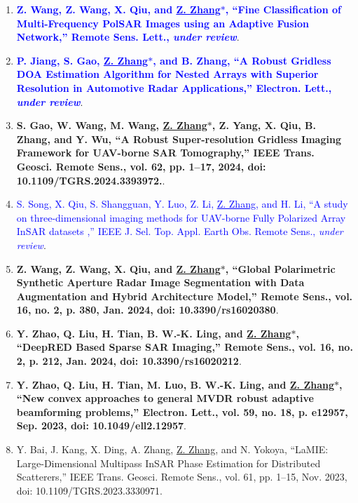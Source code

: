 \documentclass[paper=a4,fontsize=11pt]{scrartcl}
\begin{document}
\begin{enumerate}
\item \textcolor{blue}{\textbf{Z. Wang, Z. Wang, X. Qiu, and \underline{Z. Zhang$\ast$}, ``Fine Classification of Multi-Frequency PolSAR Images using an Adaptive Fusion Network,'' Remote Sens. Lett., \emph{under review}}}.

\item \textcolor{blue}{\textbf{P. Jiang, S. Gao, \underline{Z. Zhang$\ast$}, and B. Zhang, ``A Robust Gridless DOA Estimation Algorithm for Nested Arrays with Superior Resolution in Automotive Radar Applications,'' Electron. Lett., \emph{under review}}}.

\item \textbf{S. Gao, W. Wang, M. Wang, \underline{Z. Zhang$\ast$}, Z. Yang, X. Qiu, B. Zhang, and Y. Wu, ``A Robust Super-resolution Gridless Imaging Framework for UAV-borne SAR Tomography,'' IEEE Trans. Geosci. Remote Sens., vol. 62, pp. 1–17, 2024, doi: 10.1109/TGRS.2024.3393972.}.

\item \textcolor{blue}{S. Song, X. Qiu, S. Shangguan, Y. Luo, Z. Li, \underline{Z. Zhang}, and H. Li, ``A study on three-dimensional imaging methods for UAV-borne Fully Polarized Array InSAR datasets ,'' IEEE J. Sel. Top. Appl. Earth Obs. Remote Sens., \emph{under review}}.

\item \textbf{Z. Wang, Z. Wang, X. Qiu, and \underline{Z. Zhang$\ast$}, ``Global Polarimetric Synthetic Aperture Radar Image Segmentation with Data Augmentation and Hybrid Architecture Model,'' Remote Sens., vol. 16, no. 2, p. 380, Jan. 2024, doi: 10.3390/rs16020380}.

\item \textbf{Y. Zhao, Q. Liu, H. Tian, B. W.-K. Ling, and \underline{Z. Zhang$\ast$}, ``DeepRED Based Sparse SAR Imaging,'' Remote Sens., vol. 16, no. 2, p. 212, Jan. 2024, doi: 10.3390/rs16020212}.

\item \textbf{Y. Zhao, Q. Liu, H. Tian, M. Luo, B. W.-K. Ling, and \underline{Z. Zhang$\ast$}, ``New convex approaches to general MVDR robust adaptive beamforming problems,'' Electron. Lett., vol. 59, no. 18, p. e12957, Sep. 2023, doi: 10.1049/ell2.12957}.
	
\item Y. Bai, J. Kang, X. Ding, A. Zhang, \underline{Z. Zhang}, and N. Yokoya, ``LaMIE: Large-Dimensional Multipass InSAR Phase Estimation for Distributed Scatterers,'' IEEE Trans. Geosci. Remote Sens., vol. 61, pp. 1–15, Nov. 2023, doi: 10.1109/TGRS.2023.3330971.


\end{enumerate}
\end{document}
